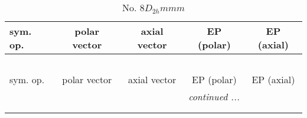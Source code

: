 \documentclass[fleqn,10pt,landscape]{jsarticle}
\begin{document}
\begin{center}
\renewcommand{\arraystretch}{1.3}
\begin{longtable}{lcccc}
\caption{No. 8\quad$D_{2h}$\quad$mmm$\quad[ orthorhombic ]}
 \\
 \hline \hline
sym. op. & polar vector & axial vector & EP (polar) & EP (axial) \\ \hline \endfirsthead

\multicolumn{4}{l}{\tablename\ \thetable{}} \\
 \hline \hline
sym. op. & polar vector & axial vector & EP (polar) & EP (axial) \\ \hline \endhead

 \hline \hline
\multicolumn{4}{r}{\footnotesize\it continued ...} \\ \endfoot

 \hline \hline
\multicolumn{4}{r}{} \\ \endlastfoot


\end{longtable}
\end{center}
\end{document}
